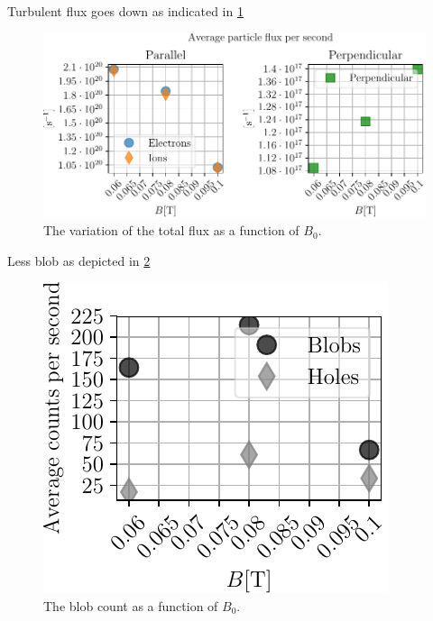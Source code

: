 %
Turbulent flux goes down as indicated in \cref{fig:BScanTotalFlux}
%
\begin{figure}[htb]
    \centering
    \includegraphics{fig/results/bScan/BScanTotalFlux}
    \caption{The variation of the total flux as a function of $B_0$.}
    \label{fig:BScanTotalFlux}
\end{figure}
%
Less blob as depicted in \cref{fig:BScanBlobCount}
%
\begin{figure}[htb]
    \centering
    \includegraphics{fig/results/bScan/BScanBlobCount}
    \caption{The blob count as a function of $B_0$.}
    \label{fig:BScanBlobCount}
\end{figure}
%
